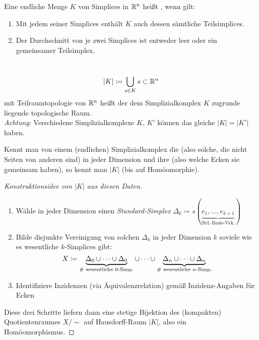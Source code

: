 \begin{definition}[Simplizialkomplex]
  Eine endliche Menge $ K $ von Simplices in $ \mathbb{R}^n $ heißt \label{def:simplizialkomplex}, wenn gilt:
  \begin{enumerate}
    \item Mit jedem seiner Simplices enthält $ K $ auch dessen sämtliche Teilsimplices.
    \item Der Durchschnitt von je zwei Simplices ist entweder leer oder ein gemeinsamer Teilsimplex. 
  \end{enumerate}
\end{definition}

\begin{definition}
  \
  \begin{equation*}
    \vert K \vert \coloneqq \bigcup_{s \in K} s \subset \mathbb{R}^n
  \end{equation*}
  mit Teilraumtopologie von $ \mathbb{R}^n $ heißt der dem Simplizialkomplex $ K $ zugrunde liegende topologische Raum. \\
  \emph{Achtung}: Verschiedene Simplizialkomplexe $ K $, $ K' $ können das gleiche $ \vert K \vert = \vert K' \vert $ haben.
\end{definition}

\begin{remark}
  Kennt man von einem (endlichen) Simplizialkomplex die \label{def:wesentlicheSimplices} (also solche, die nicht Seiten von anderen sind) in jeder Dimension und ihre \label{def:inzidenzen} (also welche Ecken sie gemeinsam haben), so kennt man $ \vert K \vert $ (bis auf Homöomorphie).
  \begin{proof}[Konstruktionsidee von $ \vert K \vert $ aus diesen Daten]
    \
    \begin{enumerate}
      \item Wähle in jeder Dimension einen \emph{Standard-Simplex} $ \Delta_k \coloneqq s(\underbrace{e_1, \dots, e_{k+1}}_{\text{Std.-Basis-Vek.}}) $ 
      \item Bilde disjunkte Vereinigung von solchen $ \Delta_k $ in jeder Dimension $ k $ soviele wie es wesentliche $ k $-Simplices gibt:
        \begin{equation*}
          X \coloneqq \underbrace{\Delta_0 \cup \dots \cup \Delta_0}_{\text{\# wesentliche $ 0 $-Simp.}} \cup \dots \cup \underbrace{\Delta_n \cup \dots \cup \Delta_n}_{\text{\# wesentliche $ n $-Simp.}}
        \end{equation*}
      \item Identifiziere Inzidenzen (via Äquivalenzrelation) gemäß Inzidenz-Angaben für Ecken
    \end{enumerate}
    Diese drei Schritte liefern dann eine stetige Bijektion des (kompakten) Quotientenraumes $ X/\sim $ auf Hausdorff-Raum $ \vert K \vert $, also ein Homöomorphismus.
  \end{proof}
\end{remark}

